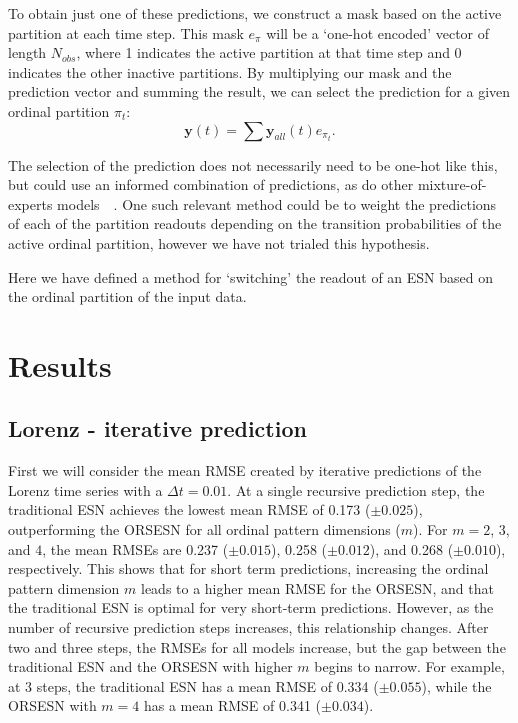 To obtain just one of these predictions, we construct a mask based on the active partition at each time step. This mask $e_\pi$ will be a `one-hot encoded' vector of length $N_{obs}$, where 1 indicates the active partition at that time step and 0 indicates the other inactive partitions. By multiplying our mask and the prediction vector and summing the result, we can select the prediction for a given ordinal partition $\pi_t$:
\[
    \mathbf{y}(t) = \sum \mathbf{y}_{all}(t)e_{\pi_t}.
\]

The selection of the prediction does not necessarily need to be one-hot like this, but could use an informed combination of predictions, as do other mixture-of-experts models~\cite{babinec_pospichal_2009}~\cite{laan_vicente_2015}. One such relevant method could be to weight the predictions of each of the partition readouts depending on the transition probabilities of the active ordinal partition, however we have not trialed this hypothesis.

Here we have defined a method for `switching' the readout of an ESN based on the ordinal partition of the input data.%




\section{Results}



\subsection{Lorenz - iterative prediction}

First we will consider the mean RMSE created by iterative predictions of the Lorenz time series with a $\Delta t = 0.01$. At a single recursive prediction step, the traditional ESN achieves the lowest mean RMSE of 0.173 ($\pm 0.025$), outperforming the ORSESN for all ordinal pattern dimensions ($m$). For $m=2$, $3$, and $4$, the mean RMSEs are 0.237 ($\pm 0.015$), 0.258 ($\pm 0.012$), and 0.268 ($\pm 0.010$), respectively. This shows that for short term predictions, increasing the ordinal pattern dimension $m$ leads to a higher mean RMSE for the ORSESN, and that the traditional ESN is optimal for very short-term predictions. However, as the number of recursive prediction steps increases, this relationship changes. After two and three steps, the RMSEs for all models increase, but the gap between the traditional ESN and the ORSESN with higher $m$ begins to narrow. For example, at 3 steps, the traditional ESN has a mean RMSE of 0.334 ($\pm 0.055$), while the ORSESN with $m=4$ has a mean RMSE of 0.341 ($\pm 0.034$).

